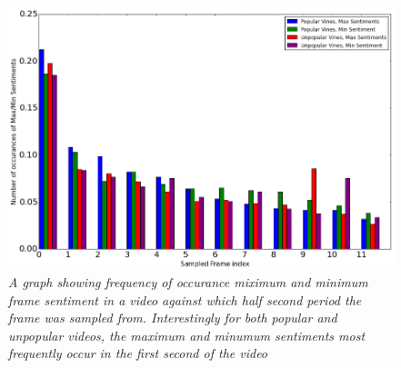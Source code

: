 \begin{figure}[!htb]
\centering
\includegraphics[width=\columnwidth]{plots/Max_Min_Pop_unpop_bar}
\caption{\textsl{A graph showing frequency of occurance miximum and minimum frame sentiment in a video against which half second period the frame was sampled from. Interestingly for both popular and unpopular videos, the maximum and minumum sentiments most frequently occur in the first second of the video}}
\label{fig:Max_Min}
\end{figure}



